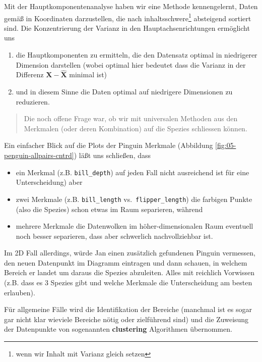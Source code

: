 \documentclass[]{book}
\providecommand{\tightlist}{%
  \setlength{\itemsep}{0pt}\setlength{\parskip}{0pt}}
\newenvironment {JHSAYS} [0] {\begin{quote}\color{jhsc}} {\end{quote}}
\theoremstyle{definition}
\theoremstyle{definition}
\theoremstyle{definition}
\theoremstyle{definition}
\theoremstyle{remark}
\begin{document}
Mit der Hauptkomponentenanalyse haben wir eine Methode kennengelernt, Daten gemäß in Koordinaten darzustellen, die nach inhaltsschwere\footnote{wenn wir Inhalt mit Varianz gleich setzen} absteigend sortiert sind. Die Konzentrierung der Varianz in den Hauptachsenrichtungen ermöglicht uns

\begin{enumerate}
\def\labelenumi{\arabic{enumi}.}
\tightlist
\item
  die Hauptkomponenten zu ermitteln, die den Datensatz optimal in niedrigerer Dimension darstellen (wobei optimal hier bedeutet dass die Varianz in der Differenz \({\mathbf{X}}-\hat {\mathbf{X}}\) minimal ist)
\item
  und in diesem Sinne die Daten optimal auf niedrigere Dimensionen zu reduzieren.
\end{enumerate}

\leavevmode\hypertarget{rem-clustering-goal}{}%
\begin{JHSAYS}
Die noch offene Frage war, ob wir mit universalen Methoden aus den Merkmalen (oder deren Kombination) auf die Spezies schliessen können.

\end{JHSAYS}

Ein einfacher Blick auf die Plots der Pinguin Merkmale (Abbildung \ref{fig:05-penguin-allpairs-cntrd}) läßt uns schließen, dass

\begin{itemize}
\tightlist
\item
  ein Merkmal (z.B. \texttt{bill\_depth}) auf jeden Fall nicht ausreichend ist für eine Unterscheidung) aber
\item
  zwei Merkmale (z.B. \texttt{bill\_length} vs.~\texttt{flipper\_length}) die farbigen Punkte (also die Spezies) schon etwas im Raum separieren, während
\item
  mehrere Merkmale die Datenwolken im höher-dimensionalen Raum eventuell noch besser separieren, dass aber schwerlich nachvollziehbar ist.
\end{itemize}

Im 2D Fall allerdings, würde Jan einen zusätzlich gefundenen Pinguin vermessen, den neuen Datenpunkt im Diagramm eintragen und dann schauen, in welchem Bereich er landet um daraus die Spezies abzuleiten. Alles mit reichlich Vorwissen (z.B. dass es 3 Spezies gibt und welche Merkmale die Unterscheidung am besten erlauben).

Für allgemeine Fälle wird die Identifikation der Bereiche (manchmal ist es sogar gar nicht klar wieviele Bereiche nötig oder zielführend sind) und die Zuweisung der Datenpunkte von sogenannten \textbf{clustering} Algorithmen übernommen.
\end{document}
